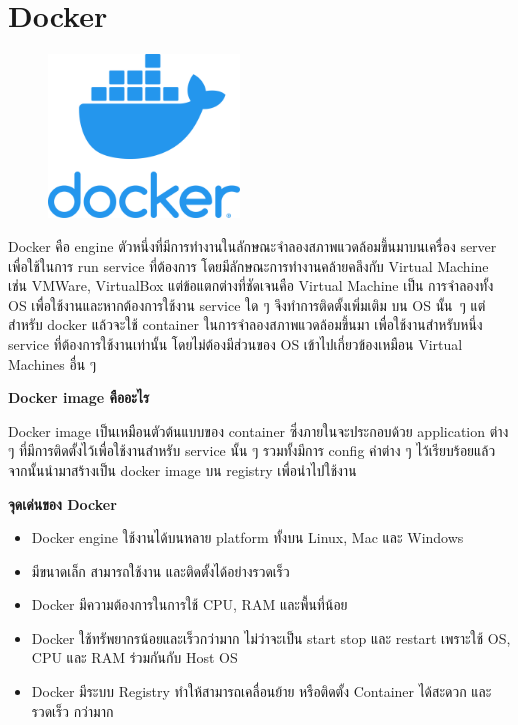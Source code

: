 \section{Docker}
\label{Dart}
\begin{figure}[!thb]
	\captionsetup{justification=centering}
	\centering
	\includegraphics[width=2in]{latex/figures/docker.png}
	\label{fig: docker}
\end{figure}
Docker คือ engine ตัวหนึ่งที่มีการทำงานในลักษณะจำลองสภาพแวดล้อมขึ้นมาบนเครื่อง server เพื่อใช้ในการ run service ที่ต้องการ โดยมีลักษณะการทำงานคล้ายคลึงกับ Virtual Machine เช่น VMWare, VirtualBox แต่ข้อแตกต่างที่ชัดเจนคือ Virtual Machine เป็น การจำลองทั้ง OS เพื่อใช้งานและหากต้องการใช้งาน service ใด ๆ จึงทำการติดตั้ง\mbox{เพิ่มเติม} บน OS \mbox{นั้น ๆ} แต่สำหรับ docker แล้วจะใช้ container ในการจำลองสภาพแวดล้อมขึ้นมา เพื่อใช้งาน\mbox{สำหรับ}หนึ่ง service ที่ต้องการใช้งานเท่านั้น โดยไม่ต้องมีส่วนของ OS เข้าไปเกี่ยวข้องเหมือน Virtual Machines อื่น ๆ
\begin{flushleft}
	\textbf{Docker image คืออะไร}
\end{flushleft}
Docker image เป็นเหมือนตัวต้นแบบของ container ซึ่งภายในจะประกอบด้วย application ต่าง ๆ ที่มีการติดตั้งไว้เพื่อใช้งานสำหรับ service นั้น ๆ รวมทั้งมีการ config ค่าต่าง ๆ ไว้เรียบร้อยแล้ว จากนั้นนำมาสร้างเป็น docker image บน registry เพื่อนำไปใช้งาน
\newpage

\begin{flushleft}
	\textbf{จุดเด่นของ Docker}
\end{flushleft}
\begin{itemize}
	\item Docker engine ใช้งานได้บนหลาย platform ทั้งบน Linux, Mac และ Windows
	\item มีขนาดเล็ก สามารถใช้งาน และติดตั้งได้อย่างรวดเร็ว
	\item Docker มีความต้องการในการใช้ CPU, RAM และพื้นที่น้อย
	\item Docker ใช้ทรัพยากรน้อยและเร็วกว่ามาก ไม่ว่าจะเป็น start stop และ restart เพราะใช้ OS, CPU และ RAM ร่วมกันกับ Host OS
	\item Docker มีระบบ Registry ทำให้สามารถเคลื่อนย้าย หรือติดตั้ง Container ได้สะดวก และ\mbox{รวดเร็ว} กว่ามาก
\end{itemize}
\newpage

